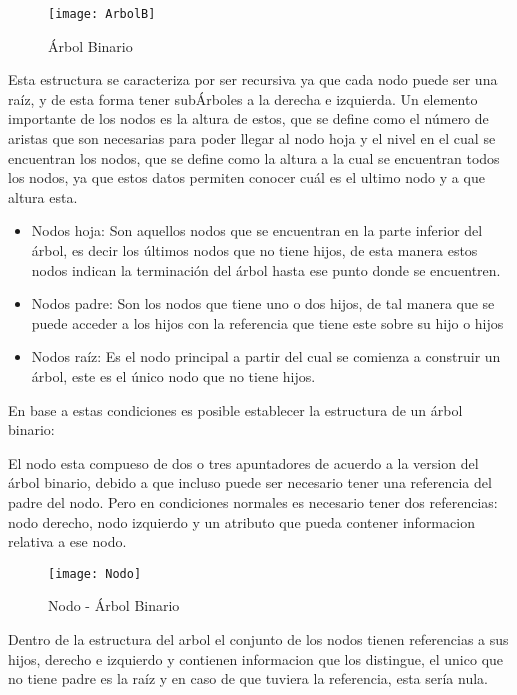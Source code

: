 \documentclass[12pt,a4paper]{article}
\begin{document}
		\begin{figure}[h]
			\centering
			\texttt{[image: ArbolB]}
			\caption{Árbol Binario}
		\end{figure}

	Esta estructura se caracteriza por ser recursiva ya que cada nodo puede ser una raíz, y de esta forma tener subÁrboles a la derecha  e izquierda. Un elemento importante de los nodos es la altura de estos, que se define como el número de aristas que son necesarias para poder llegar al nodo hoja y el nivel en el cual se encuentran los nodos, que se define como la altura a la cual se encuentran todos los nodos, ya que estos datos permiten conocer cuál es el ultimo nodo y a que altura esta.

\begin{itemize}
\item Nodos hoja: Son aquellos nodos que se encuentran en la parte 			  inferior del árbol, es decir los últimos nodos que no tiene     	  hijos, de esta manera estos nodos indican la terminación del 		      árbol hasta ese punto donde se encuentren.
\item Nodos padre: Son los nodos que tiene uno o dos hijos, de tal       	  manera que se puede acceder a los hijos con la referencia que  		  tiene este sobre su hijo o hijos
\item Nodos raíz: Es el nodo principal a partir del cual se comienza 		  a construir un árbol, este es el único nodo que no tiene hijos. 
\end{itemize}

	En base a estas condiciones es posible establecer la estructura de un árbol binario:
	
El nodo esta compueso de dos o tres apuntadores de acuerdo a la version del árbol binario, debido a que incluso puede ser necesario tener una referencia del padre del nodo. Pero en condiciones normales es necesario tener dos referencias: nodo derecho, nodo izquierdo y un atributo que pueda contener informacion relativa a ese nodo.

		\begin{figure}[h]
			\centering
			\texttt{[image: Nodo]}
			\caption{Nodo - Árbol Binario}
		\end{figure}
		
	Dentro de la estructura del arbol el conjunto de los nodos tienen referencias a sus hijos, derecho e izquierdo y contienen informacion que los distingue, el unico que no tiene padre es la raíz y en caso de que tuviera la referencia, esta sería nula.
	
\end{document}
